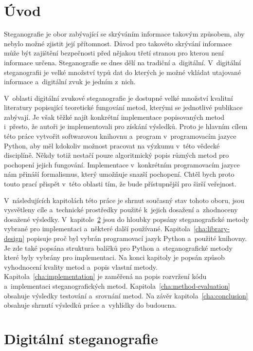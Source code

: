 \chapter{Úvod}
\label{cha:introduction}

Steganografie je obor zabývající se skrýváním informace takovým způsobem, aby
nebylo možné zjistit její přítomnost. Důvod pro takovéto skrývání informace
může být zajištění bezpečnosti před nějakou třetí stranou pro kterou není
informace určena. Steganografie se dnes dělí na tradiční a~digitální.
V~digitální steganografii je velké množství typů dat do kterých je možné
vkládat utajované informace a~digitální zvuk je jedním z~nich.

V~oblasti digitální zvukové steganografie je dostupné velké množství kvalitní
literatury popisující teoretické fungování metod, kterými se jednotlivé
publikace zabývají. Je však těžké najít konkrétní implementace popisovaných
metod i~přesto, že autoři je implementovali pro získání výsledků. Proto je
hlavním cílem této práce vytvořit softwarovou knihovnu a~program
v~programovacím jazyce Python, aby měl kdokoliv možnost pracovat na výzkumu
v~této vědecké disciplíně. Někdy totiž nestačí pouze algoritmický popis různých
metod pro pochopení jejich fungování. Implementace v~konkrétním programovacím
jazyce nám přináší formalismus, který umožňuje snazší pochopení. Chtěl bych
proto touto prací přispět v~této oblasti tím, že bude přístupnější pro širší
veřejnost.

V~následujících kapitolách této práce je shrnut současný stav tohoto oboru,
jsou vysvětleny cíle a~technické prostředky použité k~jejich dosažení
a~zhodnoceny dosažené výsledky. V~kapitole~\ref{cha:digital-steganography}
 jsou do hloubky popsány steganografické metody vybrané pro
implementaci a~některé další používané. Kapitola~\ref{cha:library-design}
popisuje proč byl vybrán programovací jazyk Python a~použité knihovny. Je zde
také popsána struktura balíčků pro Python a~steganografické metody které byly
vybrány pro implementaci. Na konci kapitoly je popsán způsob vyhodnocení
kvality metod a~popis vlastní metody. Kapitola~\ref{cha:implementation} je
zaměřená na popis rozvržení kódu a~implementaci steganografických metod.
Kapitola~\ref{cha:method-evaluation} obsahuje výsledky testování a~srovnání
metod. Na závěr kapitola~\ref{cha:conclusion} obsahuje shrnutí výsledků práce
a~vyhlídky do budoucna.


\chapter{Digitální steganografie}
\label{cha:digital-steganography}

